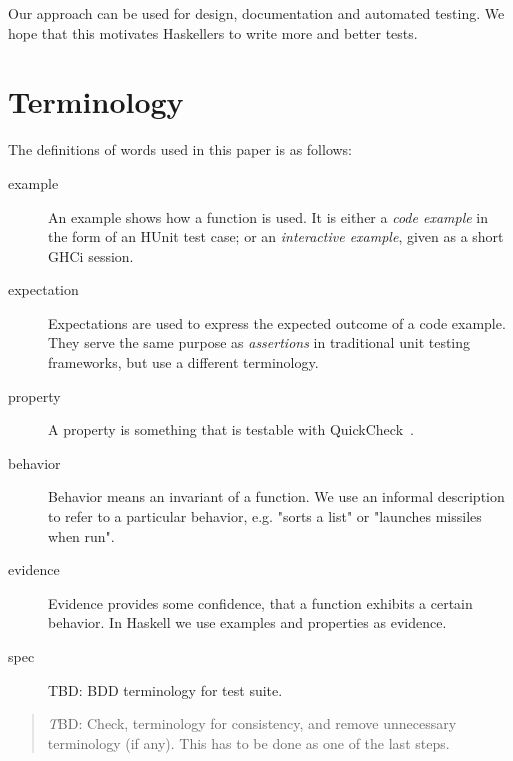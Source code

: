 \documentclass[preprint]{sigplanconf}
\begin{document}
\noindent Our approach can be used for design, documentation and
automated testing.  We hope that this motivates Haskellers to write
more and better tests.

\section{Terminology}

The definitions of words used in this paper is as follows:

\begin{description}

\item[example]
    An example shows how a function is used.  It is either a \emph{code
    example} in the form of an HUnit test case; or an \emph{interactive
    example}, given as a short GHCi session.

\item[expectation]
    Expectations are used to express the expected outcome of a code
    example.  They serve the same purpose as \emph{assertions} in
    traditional unit testing frameworks, but use a different
    terminology.

\item[property]
    A property is something that is testable with
    QuickCheck~\cite{quickcheck}.

\item[behavior]
    Behavior means an invariant of a function.  We use an informal description
    to refer to a particular behavior, e.g.  "sorts a list" or "launches
    missiles when run".

\item[evidence]
    Evidence provides some confidence, that a function exhibits a
    certain behavior.  In Haskell we use examples and properties as
    evidence.

\item[spec]
    TBD: BDD terminology for test suite.
\end{description}


\begin{quote}
    \emph TBD: Check, terminology for consistency, and remove
    unnecessary terminology (if any).  This has to be done as one of
    the last steps.
\end{quote}
\end{document}
